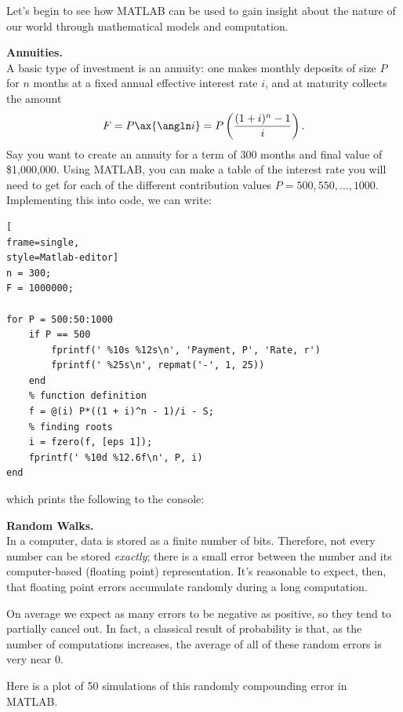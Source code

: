 \documentclass[letterpaper,12pt]{article}
\begin{document}
Let's begin to see how MATLAB can be used to gain insight about the nature of our world through mathematical models and computation.

\pagebreak

\begin{description}

\item{\textbf{Annuities.}}	\\
A basic type of investment is an annuity: one makes monthly deposits of size $P$ for $n$ months at a fixed annual effective interest rate $i$, and at maturity collects the amount
$$ F = P \ax{\angln i} = P \left(\frac{(1+i)^n - 1}{i}\right). $$ 
Say you want to create an annuity for a term of $300$ months and final value of \$1,000,000. Using MATLAB, you can make a table of the interest rate you will need to get for each of the different contribution values $P = 500, 550, \dots , 1000$. Implementing this into code, we can write:

\begin{lstlisting}[
frame=single,
style=Matlab-editor]
n = 300;
F = 1000000;

for P = 500:50:1000
    if P == 500
        fprintf(' %10s %12s\n', 'Payment, P', 'Rate, r')
        fprintf(' %25s\n', repmat('-', 1, 25))
    end
    % function definition
    f = @(i) P*((1 + i)^n - 1)/i - S;	
    % finding roots
    i = fzero(f, [eps 1]);
    fprintf(' %10d %12.6f\n', P, i)
end
\end{lstlisting}

which prints the following to the console:

\pagebreak

\item{\textbf{Random Walks.}}	\\
In a computer, data is stored as a finite number of bits. Therefore, not every number can be stored \textit{exactly}; there is a small error between the number and its computer-based (floating point) representation.  It’s reasonable to expect, then, that floating point errors accumulate randomly during a long computation. 

On average we expect as many errors to be negative as positive, so they tend to partially cancel out. In fact, a classical result of probability is that, as the number of computations increases, the average of all of these random errors is very near $0$.

Here is a plot of 50 simulations of this randomly compounding error in MATLAB.


\end{description}
\end{document}
